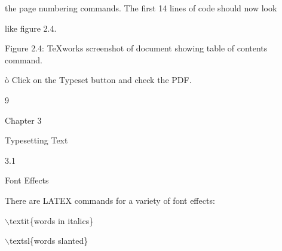 \documentclass[a4paper,portrait,12pt]{article}
\begin{document}
\begin{flushleft}
the page numbering commands. The first 14 lines of code should now look
\end{flushleft}


\begin{flushleft}
like figure 2.4.
\end{flushleft}





\begin{flushleft}
Figure 2.4: TeXworks screenshot of document showing table of contents command.
\end{flushleft}


\begin{flushleft}
\`{o} Click on the Typeset button and check the PDF.
\end{flushleft}





9










\begin{flushleft}
\newpage
Chapter 3
\end{flushleft}


\begin{flushleft}
Typesetting Text
\end{flushleft}


3.1





\begin{flushleft}
Font Effects
\end{flushleft}





\begin{flushleft}
There are LATEX commands for a variety of font effects:
\end{flushleft}


\begin{flushleft}
\ensuremath{\backslash}textit\{words in italics\}
\end{flushleft}


\begin{flushleft}
\ensuremath{\backslash}textsl\{words slanted\}
\end{flushleft}
\end{document}
